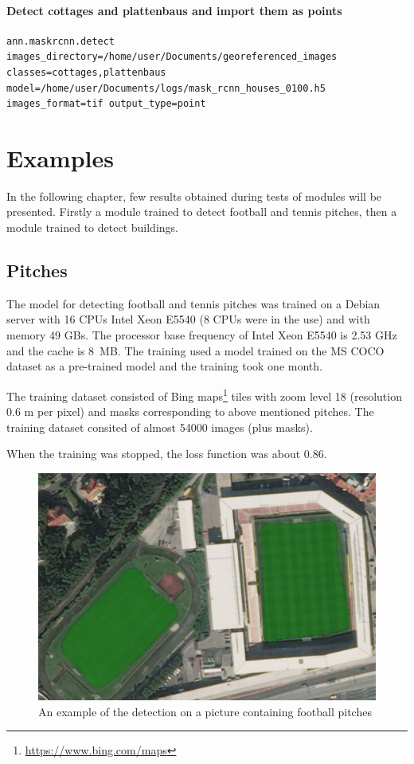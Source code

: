 \subsubsection*{Detect cottages and plattenbaus and import them as points}

{\footnotesize
\begin{lstlisting}[breaklines=true]
ann.maskrcnn.detect images_directory=/home/user/Documents/georeferenced_images classes=cottages,plattenbaus model=/home/user/Documents/logs/mask_rcnn_houses_0100.h5 images_format=tif output_type=point
\end{lstlisting}
}

\chapter{Examples}
\label{examples}

In the following chapter, few results obtained during tests of modules will be
presented. Firstly a module trained to detect football and tennis pitches, then a module trained to detect buildings.

\section{Pitches}

The model for detecting football and tennis pitches was trained on a Debian server with 16 CPUs Intel Xeon E5540 (8 CPUs were in the use) and with memory 49 GBs. The processor base frequency of Intel Xeon E5540 is 2.53 GHz and the cache is 8~MB. The training used a model trained on the MS COCO dataset as a pre-trained model and the training took one month.

The training dataset consisted of Bing maps\footnote{\url{https://www.bing.com/maps}} tiles with zoom level 18 (resolution 0.6 m per pixel) and masks corresponding to above mentioned pitches. The training dataset consited of almost 54000 images (plus masks).

When the training was stopped, the loss function was about 0.86.

\begin{figure}[H]
   \centering
	\includegraphics[width=.8\linewidth]{./pictures/out1.png}
	\caption[Detection of football pitches]{An example of the detection on a picture containing football pitches}
      \label{fig:football}
\end{figure}

